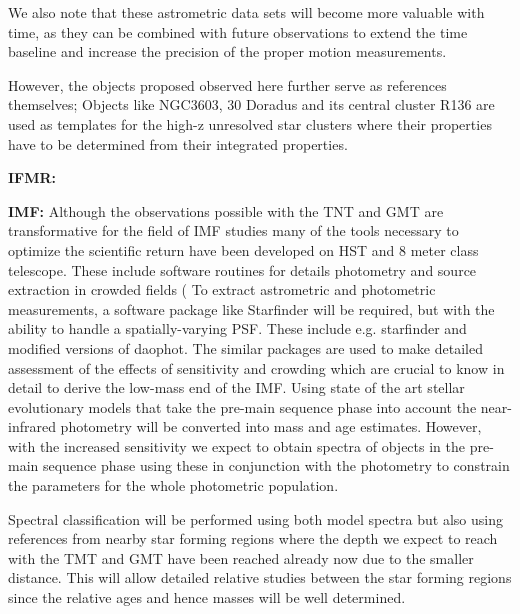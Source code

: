 \documentclass[11pt]{article}
\begin{document}
We also note that these astrometric data sets will become more valuable with time, as they can be combined with future observations to extend the time baseline and increase the precision of the proper motion measurements.

However, the objects proposed observed here further serve as references themselves; Objects like NGC3603, 30 Doradus and its central cluster R136 are used as templates for the high-z unresolved star clusters where their properties have to be determined from their integrated properties. 

{\bf IFMR: }


%

\analysisplan
{\bf IMF: } Although the observations possible with the TNT and GMT are transformative for the field of IMF studies many of the tools necessary to optimize the scientific return have been developed on HST and 8 meter class telescope. 
These include software routines for details photometry and source extraction in crowded fields (
To extract astrometric and photometric measurements, a software package like Starfinder will be required, but with the ability to handle a spatially-varying PSF. These include e.g. starfinder and modified versions of daophot. 
The similar packages are used to make detailed assessment of the effects of sensitivity and crowding which are crucial to know in detail to derive the low-mass end of the IMF. 
Using state of the art stellar evolutionary models that take the pre-main sequence phase into account the near-infrared photometry will be converted into mass and age estimates. However, with the increased sensitivity we expect to obtain spectra of objects in the pre-main sequence phase using these in conjunction with the photometry to constrain the parameters for the whole photometric population. 

Spectral classification will be performed using both model spectra but also using  references from nearby star forming regions where the depth we expect to reach with the TMT and GMT have been reached already now due to the smaller distance. 
This will allow detailed relative studies between the star forming regions since the relative ages and hence masses will be well determined. 
\end{document}
